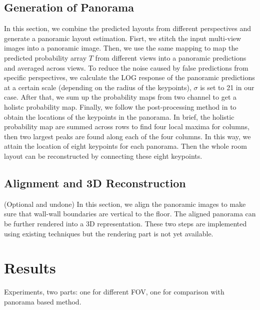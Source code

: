 

\subsection{Generation of Panorama}
\label{sec:merging}
In this section, we combine the predicted layouts from different perspectives and generate a panoramic layout estimation. Fisrt, we stitch the input multi-view images into a panoramic image. Then, we use the same mapping to map the predicted probability array $T$ from different views into a panoramic predictions and averaged across views. To reduce the noise caused by false predictions from specific perspectives, we calculate the LOG response of the panoramic predictions at a certain scale (depending on the radius of the keypoints), $\sigma$ is set to 21 in our case. After that, we sum up the probability maps from two channel to get a holistc probability map. Finally, we follow the post-processing method in \cite{LayoutNet} to obtain the locations of the keypoints in the panorama. In brief, the holistic probability map are summed across rows to find four local maxima for columns, then two largest peaks are found along each of the four columns. In this way, we attain the location of eight keypoints for each panorama. Then the whole room layout can be reconstructed by connecting these eight keypoints.


\subsection{Alignment and 3D Reconstruction}
\label{sec:align}

(Optional and undone) In this section, we align the panoramic images to make sure that wall-wall boundaries are vertical to the floor. The aligned panorama can be further rendered into a 3D representation. These two steps are implemented using existing techniques but the rendering part is not yet available.


\section{Results}
Experiments, two parts: one for different FOV, one for comparison with panorama based method.

